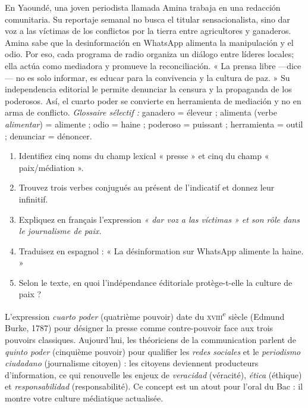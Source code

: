 \documentclass[11pt]{article}
\newcommand{\cle}[1]{{\popxbold\color{popdark}#1}}
\newcommand{\esp}[1]{\ifmmode\text{\textit{#1}}\else\begingroup\selectlanguage{spanish}\itshape #1\endgroup\fi}
\begin{document}
\begin{textebox}
En \cle{Yaoundé}, una joven \cle{periodista} llamada Amina trabaja en una \cle{redacción} comunitaria. Su \cle{reportaje} semanal no busca el \cle{titular} sensacionalista, sino \cle{dar voz a las víctimas} de los conflictos por la tierra entre \cle{agricultores} y \cle{ganaderos}. Amina sabe que la \cle{desinformación} en \cle{WhatsApp} alimenta la \cle{manipulación} y el \cle{odio}. Por eso, cada programa de radio organiza un \cle{diálogo} entre líderes locales; ella actúa como \cle{mediadora} y \cle{promueve} la \cle{reconciliación}. « La \cle{prensa} libre —dice— no es solo \cle{informar}, es \cle{educar} para la \cle{convivencia} y la \cle{cultura de paz}. » Su \cle{independencia} editorial le permite \cle{denunciar} la \cle{censura} y la \cle{propaganda} de los poderosos. Así, el \cle{cuarto poder} se convierte en \cle{herramienta} de \cle{mediación} y no en arma de \cle{conflicto}.
\tcblower
\emph{Glossaire sélectif :} \cle{ganadero} = éleveur ; \cle{alimenta} (verbe \emph{alimentar}) = alimente ; \cle{odio} = haine ; \cle{poderoso} = puissant ; \cle{herramienta} = outil ; \cle{denunciar} = dénoncer.
\end{textebox}

\begin{exercice}
\begin{enumerate}
\item Identifiez cinq noms du champ lexical « presse » et cinq du champ « paix/médiation ».
\item Trouvez trois verbes conjugués au présent de l'indicatif et donnez leur infinitif.
\item Expliquez en français l'expression \esp{« dar voz a las víctimas »} et son rôle dans le journalisme de paix.
\item Traduisez en espagnol : « La désinformation sur WhatsApp alimente la haine. »
\item Selon le texte, en quoi l'indépendance éditoriale protège-t-elle la culture de paix ?
\end{enumerate}
\end{exercice}

\begin{savaistu}
L'expression \emph{cuarto poder} (quatrième pouvoir) date du \textsc{xviii}\textsuperscript{e} siècle (Edmund Burke, 1787) pour désigner la presse comme contre-pouvoir face aux trois pouvoirs classiques. Aujourd'hui, les théoriciens de la communication parlent de \emph{quinto poder} (cinquième pouvoir) pour qualifier les \emph{redes sociales} et le \emph{periodismo ciudadano} (journalisme citoyen) : les citoyens deviennent producteurs d'information, ce qui renouvelle les enjeux de \emph{veracidad} (véracité), \emph{ética} (éthique) et \emph{responsabilidad} (responsabilité). Ce concept est un atout pour l'oral du Bac : il montre votre culture médiatique actualisée.
\end{savaistu}
\end{document}
